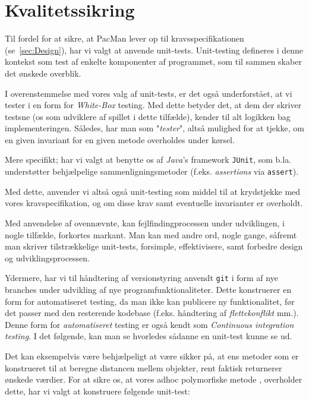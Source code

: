 \documentclass{article}
\newcommand{\code}[1]{\small\texttt{#1}}
\newcommand{\method}[1]{\textcolor{Orange}{\small\ttfamily\seqsplit{#1}}}
\theoremstyle{mytheoremstyle}
\theoremstyle{mytheoremstyle}
\theoremstyle{myproblemstyle}
\begin{document}
\section{Kvalitetssikring}\label{sec:Kvalitetssikring} %
Til fordel for at sikre, at PacMan lever op til kravsspecifikationen
(se \autoref{sec:Design}), har vi valgt at anvende unit-tests. Unit-testing
defineres i denne kontekst som test af enkelte komponenter af programmet, som
til sammen skaber det ønskede overblik.

I overenstemmelse med vores valg af unit-tests, er det også underforstået, at vi
tester i en form for \textit{White-Box} testing. Med dette betyder det, at dem der
skriver testsne (os som udviklere af spillet i dette tilfælde), kender til alt
logikken bag implementeringen. Således, har man som "\textit{tester}", altså
mulighed for at tjekke, om en given invariant for en given metode overholdes
under kørsel.

Mere specifikt; har vi valgt at benytte os af \textit{Java}'s framework
\texttt{JUnit}, som b.la. understøtter behjælpelige sammenligningsmetoder (f.eks.
\textit{assertions} via \code{assert}).

Med dette, anvender vi altså også unit-testing som middel til at krydstjekke med
vores kravspecifikation, og om disse krav samt eventuelle invarianter er
overholdt.

Med anvendelse af ovennævnte, kan fejlfindingprocessen under udviklingen, i
nogle tilfælde, forkortes markant. Man kan med andre ord, nogle gange, såfremt
man skriver tilstrækkelige unit-tests, forsimple, effektivisere, samt forbedre
design og udviklingsprocessen.

Ydermere, har vi til håndtering af versionstyring anvendt \code{git} i form af
nye branches under udvikling af nye programfunktionaliteter. Dette konstruerer
en form for automatiseret testing, da man ikke kan publicere ny funktionalitet,
før det passer med den resterende kodebase (f.eks. håndtering af
\textit{flettekonflikt} mm.). Denne form for \textit{automatiseret} testing er
også kendt som \textit{Continuous integration testing}. I det følgende, kan man
se hvorledes sådanne en unit-test kunne se ud.

Det kan eksempelvis være behjælpeligt at være sikker på, at ens metoder som er
konstrueret til at beregne distancen mellem objekter, rent faktisk returnerer
ønskede værdier. For at sikre os, at vores adhoc polymorfiske metode
\method{distanceBetween}, overholder dette, har vi valgt at konstruere følgende
unit-test:
\end{document}
